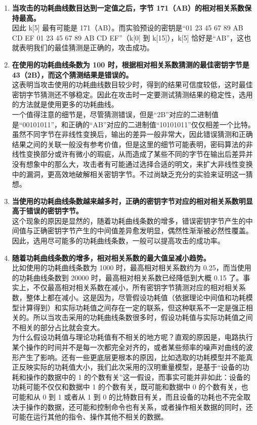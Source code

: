 \begin{enumerate}
    \item \textbf{当攻击的功耗曲线数目达到一定值之后，字节 171（AB）的相对相关系数保持最高。}\\
    因此 {\cnsls k[5]} 最有可能是 171（AB）。而实验预设的密钥是“01 23 45 67 89 AB CD EF 01 23 45 67 89 AB CD EF”（{\cnsls k[0]} 到 {\cnsls k[15]}），{\cnsls k[5]} 恰好是“AB”，这也就表明我们的最佳猜测是正确的，攻击成功。
    \item \textbf{在使用的功耗曲线条数为 100 时，根据相对相关系数猜测的最佳密钥字节是 43（2B），而这个猜测结果是错误的。}\\
    这表明当攻击使用的功耗曲线数目较少时，得到的结果可信度较低，这时最佳密钥字节猜测还不够稳定。因此在攻击时一定要测试猜测结果的稳定性，选用的方法就是使用更多的功耗曲线。\\
    一个值得注意的细节是，尽管猜测错误，但是“2B”对应的二进制值是“00101011”，和正确的“AB”对应的二进制值“10101011”仅仅相差一个比特。虽然不同字节在非线性变换后，输出的差异一般非常大，因此错误猜测和正确结果之间的关联一般没有参考价值，但是这里的细节可能表明，密码算法的非线性变换部分或许有微小的瑕疵，从而造成了某些不同的字节在输出后差异并没有想象中的那么大，攻击者有可能通过选择合适的明文，来扩大非线性变换中的漏洞，更高效地破解相关密钥字节。不过尚缺乏充分的实验来证明这一猜想。
    \item \textbf{当使用的功耗曲线条数越来越多时，正确的密钥字节对应的相对相关系数明显高于错误的密钥字节。}\\
    这个现象的原因是显然的，随着功耗曲线条数的增多，错误密钥字节产生的中间值与正确密钥字节产生的中间值差异愈发明显，偶然性渐渐被必然性覆盖。因此，选用尽可能多的功耗曲线条数，一般可以提高攻击的成功率。
    \item \textbf{随着功耗曲线条数的增多，相对相关系数的最大值呈减小趋势。}\\
    比如使用的功耗曲线条数为 1000 时，最高相对相关系数约为 0.25，而当使用的功耗曲线条数到 20000 时，最高相对相关系数已经降低到大概 0.15 了。事实上，不仅最高相对相关系数在减小，所有密钥字节猜测对应的相对相关系数，整体上都在减小。这是因为，尽管假设功耗值（依据理论中间值和功耗模型计算得到）和实际功耗值之间存在一定的联系，但这种联系不一定是强正相关的。所以当攻击采用的功耗曲线条数很多时，假设功耗值与实际功耗值之间不相关的部分占比就会变大。\\
    为什么假设功耗值与理论功耗值有不相关的地方呢？直观的原因是，电路执行某个操作的时间并不是每一次都完全对齐的，或者某些频率的噪声对曲线的波形产生了影响。还有一些更底层更根本的原因，比如选取的功耗模型并不能真正反映实际的功耗值大小，我们此次采用的汉明重量模型，是基于“设备的功耗和操作的数据中的 1 的个数有关”这一假设，而事实可能并非如此：设备的功耗可能不仅仅和数据中 1 的个数有关，既可能和数据中 0 的个数有关，也可能和从 0 到 1 或者从 1 到 0 的比特数目有关，而且设备的功耗也不完全取决于操作的数据，还可能和控制命令也有关系，或者操作相关数据的同时，还可能在运行其他的指令、操作其他不相关的数据。\\

\end{enumerate}
